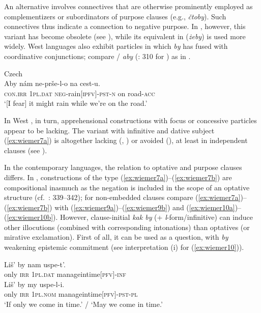 \documentclass[output=paper,colorlinks,citecolor=brown]{langscibook}
\begin{document}
An alternative involves connectives that are otherwise prominently employed as complementizers or subordinators of purpose clauses (e.g.,  \textit{čtoby}). Such connectives thus indicate a connection to negative purpose. In , however, this variant has become obsolete (see ), while its equivalent in  (\textit{żeby}) is used more widely. West  languages also exhibit particles in which \textit{by} has fused with coordinative conjunctions; compare / \textit{aby} (\citealt{lichtenberk1995}: 310 for ) as in .


\ea \textnormal{Czech} \\
\label{ex:wiemer8} 
\gll Aby nám ne-prše-l-o na cest-u. \\
\textsc{con.irr} \textsc{1pl.dat} \textsc{neg}-rain\textsc{[ipfv]-pst-n} on road-\textsc{acc} \\
\glt `[I fear] it might rain while we're on the road.'
\z


In West , in turn, apprehensional constructions with focus or concessive particles appear to be lacking. The variant with infinitive and dative subject (\ref{ex:wiemer7a}) is altogether lacking (, ) or avoided (), at least in independent clauses (see ). 

In the contemporary languages, the relation to optative and purpose clauses differs. In , constructions of the type (\ref{ex:wiemer7a})--(\ref{ex:wiemer7b}) are compositional \mbox{inasmuch} as the negation is included in the scope of an optative structure (cf.\ \citealt{Dobrushina2016}: 339--342); for non-embedded clauses compare (\ref{ex:wiemer7a})--(\ref{ex:wiemer7b}) with (\ref{ex:wiemer9a})--(\ref{ex:wiemer9b}) and (\ref{ex:wiemer10a})--(\ref{ex:wiemer10b}). However, clause-initial \textit{kak by} (+ \textit{l}-form/infinitive) can induce other illocutions (combined with corresponding intonations) than optatives (or mirative exclamation). First of all, it can be used as a question, with \textit{by} weakening epistemic commitment (see interpretation (i) for (\ref{ex:wiemer10})).

\newpage
\ea \textnormal{}
\label{ex:wiemer9} 
\ea \label{ex:wiemer9a}
\gll Liš' by {\op}nam{\cp} uspe-t'. \\
only \textsc{irr} \textsc{1pl.dat} manage\textunderscore in\textunderscore time\textsc{[pfv]-inf} \\
\ex \label{ex:wiemer9b}
\gll Liš' by my uspe-l-i. \\
only \textsc{irr} \textsc{1pl.nom} manage\textunderscore in\textunderscore time\textsc{[pfv]-pst-pl}\\
\glt `If only we come in time.' / `May we come in time.'
\z
\z
\end{document}
